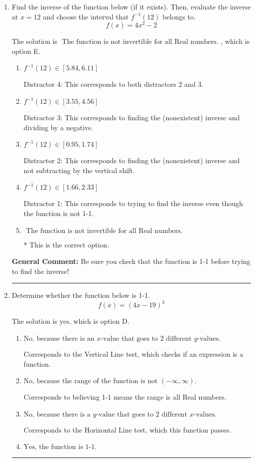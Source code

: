 \documentclass{extbook}[14pt]
\newcommand{\litem}[1]{\item #1

\rule{\textwidth}{0.4pt}}
\begin{document}
\begin{enumerate}\litem{
Find the inverse of the function below (if it exists). Then, evaluate the inverse at $x = 12$ and choose the interval that $f^{-1}(12)$ belongs to.
\[ f(x) = 4 x^2 - 2 \]

The solution is \( \text{ The function is not invertible for all Real numbers. } \), which is option E.\begin{enumerate}[label=\Alph*.]
\item \( f^{-1}(12) \in [5.84, 6.11] \)

 Distractor 4: This corresponds to both distractors 2 and 3.
\item \( f^{-1}(12) \in [3.55, 4.56] \)

 Distractor 3: This corresponds to finding the (nonexistent) inverse and dividing by a negative.
\item \( f^{-1}(12) \in [0.95, 1.74] \)

 Distractor 2: This corresponds to finding the (nonexistent) inverse and not subtracting by the vertical shift.
\item \( f^{-1}(12) \in [1.66, 2.33] \)

 Distractor 1: This corresponds to trying to find the inverse even though the function is not 1-1. 
\item \( \text{ The function is not invertible for all Real numbers. } \)

* This is the correct option.
\end{enumerate}

\textbf{General Comment:} Be sure you check that the function is 1-1 before trying to find the inverse!
}
\litem{
Determine whether the function below is 1-1.
\[ f(x) = (4 x - 19)^3 \]

The solution is \( \text{yes} \), which is option D.\begin{enumerate}[label=\Alph*.]
\item \( \text{No, because there is an $x$-value that goes to 2 different $y$-values.} \)

Corresponds to the Vertical Line test, which checks if an expression is a function.
\item \( \text{No, because the range of the function is not $(-\infty, \infty)$.} \)

Corresponds to believing 1-1 means the range is all Real numbers.
\item \( \text{No, because there is a $y$-value that goes to 2 different $x$-values.} \)

Corresponds to the Horizontal Line test, which this function passes.
\item \( \text{Yes, the function is 1-1.} \)


\end{enumerate}}
\end{enumerate}
\end{document}
